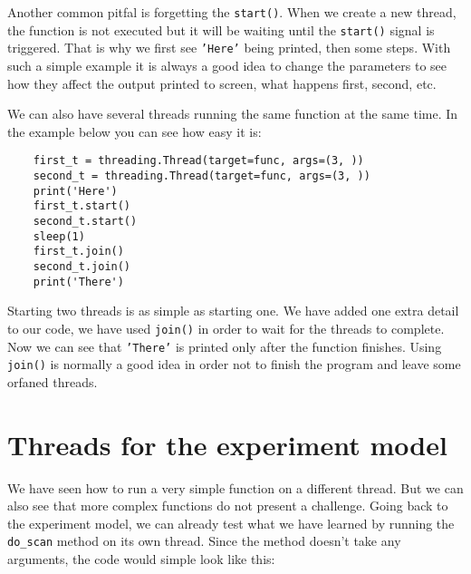Another common pitfal is forgetting the \texttt{start()}. When we create a new thread, the function is not executed but it will be waiting until the \texttt{start()} signal is triggered. That is why we first see \texttt{'Here'} being printed, then some steps. With such a simple example it is always a good idea to change the parameters to see how they affect the output printed to screen, what happens first, second, etc.

We can also have several threads running the same function at the same time. In the example below you can see how easy it is:

\begin{verbatim}
    first_t = threading.Thread(target=func, args=(3, ))
    second_t = threading.Thread(target=func, args=(3, ))
    print('Here')
    first_t.start()
    second_t.start()
    sleep(1)
    first_t.join()
    second_t.join()
    print('There')
\end{verbatim}

Starting two threads is as simple as starting one. We have added one extra detail to our code, we have used \texttt{join()} in order to wait for the threads to complete. Now we can see that \texttt{'There'} is printed only after the function finishes. Using \texttt{join()} is normally a good idea in order not to finish the program and leave some orfaned threads.


\section{Threads for the experiment model}\label{section:threads-experiment-model}
We have seen how to run a very simple function on a different thread. But we can also see that more complex functions do not present a challenge. Going back to the experiment model, we can already test what we have learned by running the \texttt{do\_scan} method on its own thread. Since the method doesn't take any arguments, the code would simple look like this:

